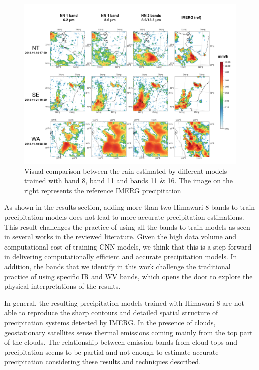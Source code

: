 \documentclass[3p,times]{elsarticle}
\begin{document}
\begin{figure}%
    \includegraphics[width=14cm]{output_cmp.png}
	\caption{Visual comparison between the rain estimated by different models trained with band 8, band 11 and bands 11 \& 16. The image on the right represents the reference IMERG precipitation}%
    \label{output_cmp}%
\end{figure}

As shown in the results section, adding more than two Himawari 8 bands to train precipitation models does not lead to more accurate precipitation estimations. This result challenges the practice of using all the bands to train models as seen in several works in the reviewed literature. Given the high data volume and computational cost of training CNN models, we think that this is a step forward in delivering computationally efficient and accurate precipitation models. In addition, the bands that we identify in this work challenge the traditional practice of using specific IR and WV bands, which opens the door to explore the physical interpretations of the results.

In general, the resulting precipitation models trained with Himawari 8 are not able to reproduce the sharp contours and detailed spatial structure of precipitation systems detected by IMERG. In the presence of clouds, geostationary satellites sense thermal emissions coming mainly from the top part of the clouds. The relationship between emission bands from cloud tops and precipitation seems to be partial and not enough to estimate accurate precipitation considering these results and techniques described.
\end{document}
